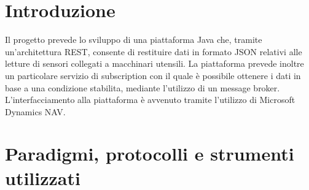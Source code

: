 \section{Introduzione}
Il progetto prevede lo sviluppo di una piattaforma Java che, tramite un'architettura REST, consente di restituire dati in formato JSON relativi alle letture di sensori collegati a macchinari utensili. La piattaforma prevede inoltre un particolare servizio di subscription con il quale è possibile ottenere i dati in base a una condizione stabilita, mediante l’utilizzo di un message broker. L’interfacciamento alla piattaforma è avvenuto tramite l’utilizzo di Microsoft Dynamics NAV.
\clearpage
\section{Paradigmi, protocolli e strumenti utilizzati}


